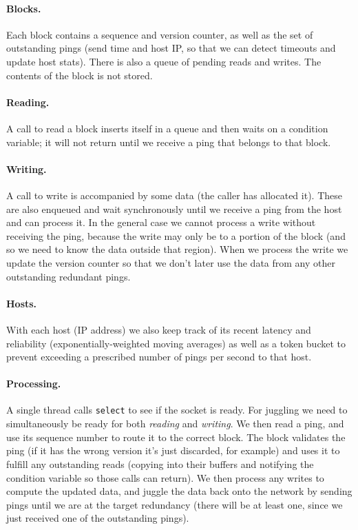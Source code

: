\documentclass[twocolumn]{article}
\begin{document}
\paragraph{Blocks.} Each block contains a sequence and version counter,
as well as the set of outstanding pings (send time and host IP, so that
we can detect timeouts and update host stats). There is also a queue
of pending reads and writes. The contents of the block is not stored.

\paragraph{Reading.} A call to read a block inserts itself in a queue
and then waits on a condition variable; it will not return until we
receive a ping that belongs to that block.

\paragraph{Writing.} A call to write is accompanied by some data (the
caller has allocated it). These are also enqueued and wait
synchronously until we receive a ping from the host and can process
it. In the general case we cannot process a write without receiving
the ping, because the write may only be to a portion of the block (and
so we need to know the data outside that region). When we process the
write we update the version counter so that we don't later use the
data from any other outstanding redundant pings.

\paragraph{Hosts.} With each host (IP address) we also keep track of
its recent latency and reliability (exponentially-weighted moving
averages) as well as a token bucket to prevent exceeding a prescribed
number of pings per second to that host.

\paragraph{Processing.} A single thread calls {\tt select} to see
if the socket is ready. For juggling we need to simultaneously be
ready for both {\em reading} and {\em writing}. We then read a ping,
and use its sequence number to route it to the correct block. The
block validates the ping (if it has the wrong version it's just
discarded, for example) and uses it to fulfill any outstanding reads
(copying into their buffers and notifying the condition variable so
those calls can return). We then process any writes to compute the
updated data, and juggle the data back onto the network by sending
pings until we are at the target redundancy (there will be at least
one, since we just received one of the outstanding pings).
\end{document}
